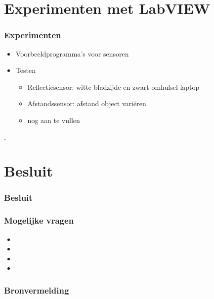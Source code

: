 \documentclass
   [kulak] %
   {kulakbeamer}
\begin{document}



\section[Experimenten]{Experimenten met LabVIEW}

\begin{frame}
	\frametitle{Experimenten}
	\begin{itemize}
		\item Voorbeeldprogramma's voor sensoren
		\item Testen
		\begin{itemize}
			\item Reflectiesensor: witte bladzijde en zwart omhulsel laptop
			\item Afstandssensor: afstand object variëren
			\item nog aan te vullen
		\end{itemize}
	\end{itemize}.
\end{frame}



\section{Besluit}
\begin{frame}
\frametitle{Besluit}

\end{frame}


\begin{frame}
\frametitle{Mogelijke vragen}
	\begin{itemize}
		\item 
		\item 
		\item 
		\item 
	\end{itemize}
\end{frame}

\begin{frame}
\frametitle{Bronvermelding}
	
	
	
\end{frame}
\end{document}
